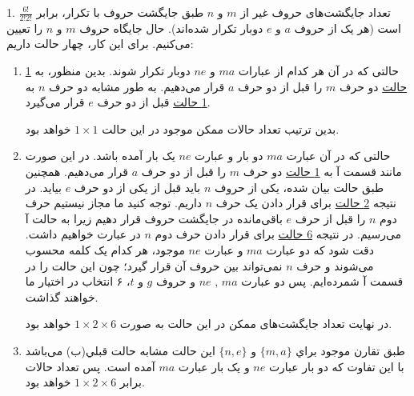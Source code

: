   
    1. 
    \p
    تعداد جایگشت‌های حروف غیر از $m$ و $n$ طبق جایگشت حروف با تکرار، برابر $\frac{6!}{2!2!}$ است
    (هر یک از حروف $a$ و $e$ دوبار تکرار شده‌اند).
    حال جایگاه حروف $m$ و $n$ را تعیین می‌کنیم.
    برای این کار، چهار حالت داریم:
    \begin{enumerate}
      \item 
      \p
      حالتی که در آن هر کدام از عبارات $ma$ و $ne$
      دوبار تکرار شوند. بدین منظور، به
      \underline{1 حالت} 
       دو حرف 
      $m$ 
      را قبل از دو حرف 
      $a$
      قرار می‌دهیم.
      به طور مشابه دو حرف
       $n$ 
     به
     \underline{1 حالت}
       قبل از دو حرف 
       $e$
       قرار می‌گیرد.
      
      \p
      بدین ترتیب تعداد حالات ممکن موجود در این حالت 
      $1\times1$
      خواهد بود.
      
      \item
      \p
      حالتی که در آن عبارت $ma$ دو بار و عبارت $ne$ 
      یک بار آمده باشد. در این صورت مانند قسمت آ به
      \underline{1 حالت}  
       دو حرف 
      $m$
      را قبل از دو حرف 
      $a$
      قرار می‌دهیم.
      همچنین طبق حالت بیان شده، یکی از حروف 
      $n$ باید قبل از یکی از دو حرف $e$
      بیاید. در نتیجه
      \underline{2 حالت}
      برای قرار دادن یک حرف $n$ داریم.
      توجه کنید ما مجاز نیستیم حرف دوم
      $n$
      را قبل از حرف $e$
      باقی‌مانده در جایگشت حروف قرار دهیم زیرا به حالت آ می‌رسیم.
      در نتیجه
      \underline{6 حالت}
      برای قرار دادن حرف دوم 
      $n$ در عبارت خواهیم داشت.
      دقت شود که دو عبارت $ma$ و عبارت 
      $ne$ 
      موجود،
      هر کدام یک کلمه محسوب می‌شوند و حرف 
      $n$
      نمی‌تواند بین حروف آن قرار گیرد؛
      چون این حالت را در قسمت آ شمرده‌ایم.
      پس دو عبارت
        $ma$
      , $ne$
       و حروف
       $g$ و 
      $t$، 
      ۶
      انتخاب در اختیار ما خواهند گذاشت.
      
      \p
     در نهایت تعداد جایگشت‌های ممکن در این حالت به صورت 
      $1\times 2\times 6$
      خواهد بود.

      \item
      \p
      طبق تقارن موجود براي 
      $\{m,a\}$ و
      $\{n,e\}$
      اين حالت  مشابه حالت قبلي(ب) می‌باشد با این تفاوت که دو بار 
      عبارت $ne$ و یک بار عبارت $ma$ آمده است.
       پس تعداد حالات برابر
      $1\times 2\times 6$ خواهد بود.
      

\end{enumerate}
